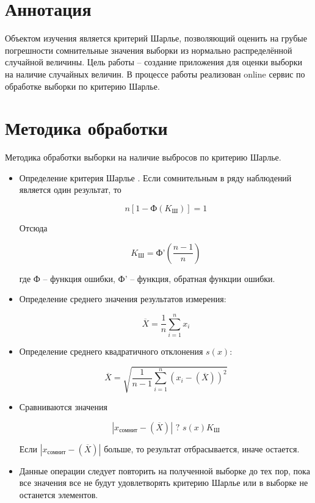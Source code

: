\documentclass[a4paper,14pt]{article}
\begin{document}


\section{Аннотация}

Объектом изучения является критерий Шарлье, позволяющий оценить на грубые погрешности сомнительные значения выборки из нормально распределённой случайной величины. Цель работы -- создание приложения для оценки выборки на наличие случайных величин. В процессе работы реализован online сервис по обработке выборки по критерию Шарлье.


\section{Методика обработки}

Методика обработки выборки на наличие выбросов по критерию Шарлье.
\begin{itemize}
	\item Определение критерия Шарлье \cite{krSh}. Если сомнительным в ряду наблюдений является один результат, то
	
	$$n[1 - \text{Ф}(K_{\text{Ш}})] = 1$$
	
	Отсюда 
	
	$$K_{\text{Ш}} =  \text{Ф'}(\frac{n-1}{n})$$
	
	где  $\text{Ф}$ -- функция ошибки, $\text{Ф'}$ -- функция, обратная функции ошибки.
	
	\item Определение среднего значения результатов измерения:
	
	$$\overline{X} = \dfrac{1}{n}\sum_{i=1}^{n}x_i$$
	
	\item Определение среднего квадратичного отклонения $s(x)$:
	
	$$\overline{X} = \sqrt{\dfrac{1}{n-1}\sum_{i=1}^{n}(x_i - (\overline X))^2}$$
	
	\item Сравниваются значения \cite{zalaznih}
	
	$$|x_{\text{сомнит}} - (\overline X)| \text{ ? } s(x)K_{\text{Ш}}$$
	
	Если $|x_{\text{сомнит}} - (\overline X)|$ больше, то результат отбрасывается, иначе остается.
	
	\item Данные операции следует повторить на полученной выборке до тех пор, пока все значения все не будут удовлетворять критерию Шарлье или в выборке не останется элементов.
\end{itemize}
\end{document}
